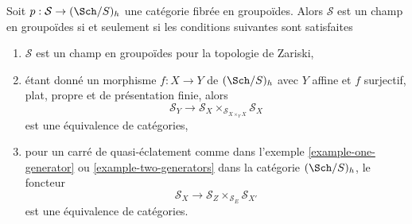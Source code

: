 \begin{lemma}
\label{lemma-refine-check-h-stack}
Soit $p : \mathcal{S} \to (\Sch/S)_h$ une catégorie fibrée en groupoïdes.
Alors $\mathcal{S}$ est un champ en groupoïdes si et seulement si les conditions
suivantes sont satisfaites
\begin{enumerate}
\item $\mathcal{S}$ est un champ en groupoïdes pour la topologie de Zariski,
\item étant donné un morphisme $f : X \to Y$ de $(\Sch/S)_h$ avec $Y$ affine
et $f$ surjectif, plat, propre et de présentation finie, alors
$$
\mathcal{S}_Y \longrightarrow
\mathcal{S}_X \times_{\mathcal{S}_{X \times_Y X}} \mathcal{S}_X
$$
est une équivalence de catégories,
\item pour un carré de quasi-éclatement comme dans
l'exemple \ref{example-one-generator} ou \ref{example-two-generators}
dans la catégorie $(\Sch/S)_h$, le foncteur
$$
\mathcal{S}_X \longrightarrow
\mathcal{S}_Z \times_{\mathcal{S}_E} \mathcal{S}_{X'}
$$
est une équivalence de catégories.
\end{enumerate}
\end{lemma}

